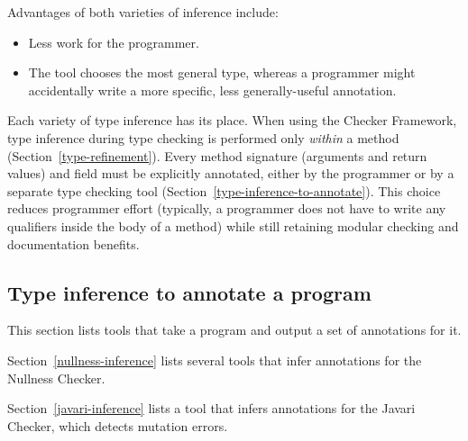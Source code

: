 Advantages of both varieties of inference include:
\begin{itemize}
\item
  Less work for the programmer.
\item
  The tool chooses the most general type, whereas a programmer might
  accidentally write a more specific, less generally-useful annotation.
\end{itemize}


Each variety of type inference has its place.  When using the Checker
Framework, type inference during type checking is performed only
\emph{within} a method (Section~\ref{type-refinement}).  Every method
signature (arguments and return values) and field must be explicitly annotated,
either by the programmer or by a separate type checking tool
(Section~\ref{type-inference-to-annotate}).  This choice reduces programmer
effort (typically, a programmer does not have to write any qualifiers
inside the body of a method) while still retaining modular checking and
documentation benefits.


\subsection{Type inference to annotate a program\label{type-inference-to-annotate}}

This section lists tools that take a program and output a set of
annotations for it.

Section~\ref{nullness-inference} lists several tools that infer
annotations for the Nullness Checker.

Section~\ref{javari-inference} lists a tool that infers
annotations for the Javari Checker, which detects mutation errors.


